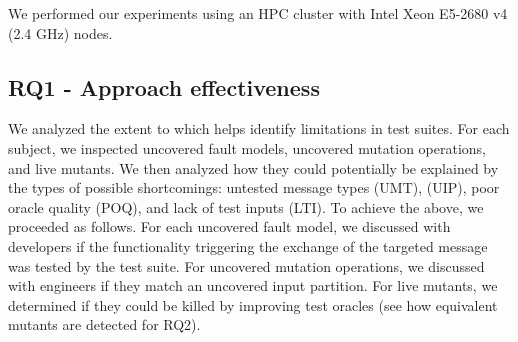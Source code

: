 
We performed our experiments using an HPC cluster with Intel Xeon E5-2680 v4 (2.4 GHz) nodes.



\subsection{RQ1 - Approach effectiveness}


We analyzed the extent to which \APPR helps identify limitations in test suites.
For each subject, we inspected uncovered fault models, uncovered mutation operations, and live mutants. We then analyzed how they could potentially be explained by the types of possible shortcomings:
untested message types (UMT),  (UIP), poor oracle quality (POQ), and lack of test inputs (LTI).
To achieve the above, we proceeded as follows.
For each uncovered fault model, we discussed with developers if the functionality triggering the exchange of the targeted message was tested by the test suite.
For uncovered mutation operations, we discussed with engineers if they match an uncovered input partition.
For live mutants, we determined if they could be killed by improving test oracles (see how equivalent mutants are detected for RQ2).

